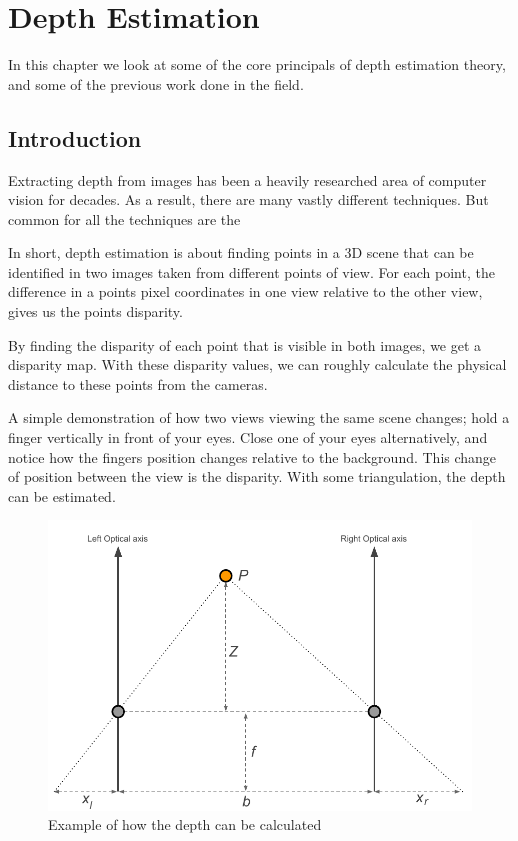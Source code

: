 \chapter{Depth Estimation}
\label{sec:depthestimation_theory}


In this chapter we look at some of the core principals of depth
estimation theory, and some of the previous work done in the field.

\section{Introduction}

Extracting depth from images has been a heavily researched area of
computer vision for decades. As a result, there are many vastly
different techniques. But common for all the techniques are the

In short, depth estimation is about finding points in a 3D scene that
can be identified in two images taken from different points of
view. For each point, the difference in a points pixel coordinates in
one view relative to the other view, gives us the points disparity.

By finding the disparity of each point that is visible in both images,
we get a disparity map. With these disparity values, we can roughly
calculate the physical distance to these points from the cameras.

A simple demonstration of how two views viewing the same scene
changes; hold a finger vertically in front of your eyes. Close one of
your eyes alternatively, and notice how the fingers position changes
relative to the background. This change of position between the view
is the disparity. With some triangulation, the depth can be estimated.

\begin{figure}
  \label{fig:depth-theory}
  \includegraphics[width=\textwidth]{images/depth-estimation-theory.pdf}
  \caption{Example of how the depth can be calculated}
\end{figure}

